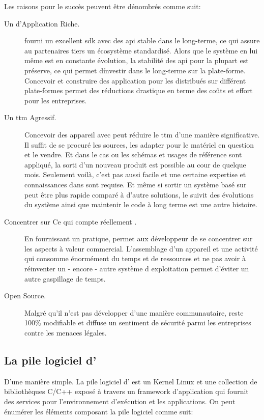Les raisons pour le succès \android{} peuvent être
dénombrés comme suit:
\begin{description}
\item [Un  d'Application Riche.] \android{} fourni un
excellent \gls{sdk} avec des \gls{api} stable dans le long-terme, ce
qui assure au partenaires tiers un écosystème standardisé. Alors que
le système en lui même est en constante évolution, la stabilité des
\gls{api} pour la plupart est préserve, ce qui permet d\'investir dans
le long-terme sur la plate-forme. Concevoir et construire des application
pour les distribués sur différent plate-formes permet des réductions
drastique en terme des coûts et effort pour les entreprises.
\item [Un \gls{ttm} Agressif.] Concevoir des appareil avec \android{}
peut réduire le \gls{ttm} d'une manière significative. Il suffit
de se procuré les sources, les adapter pour le matériel en question
et le vendre. Et dans le cas ou les schémas et usages de référence
sont appliqué, la sorti d'un nouveau produit est possible au cour de
quelque mois. Seulement voilà, c'est pas aussi facile et une certaine
expertise et connaissances dans \android{} sont requise. Et même si
sortir un système basé sur \android{} peut être plus rapide comparé
à d'autre solutions, le suivit des évolutions du système ainsi que
maintenir le code à long terme est une autre histoire.
\item [Concentrer sur \og Ce qui compte réellement \fg.] En fournissant
un  pratique, \android{} permet aux développeur de se
concentrer sur les aspects à valeur commercial. L'assemblage d'un
appareil et une activité qui consomme énormément du temps et de
ressources et ne pas avoir à réinventer un - encore - autre système
d exploitation permet d'éviter un autre gaspillage de temps.
\item [Open Source.] Malgré qu'il n'est pas développer d'une manière
communautaire, \android{} reste 100\% modifiable et diffuse un sentiment
de sécurité parmi les entreprises contre les menaces légales.
\end{description}

\subsection[La pile logiciel d'\android{}]{La pile logiciel d'\android{}\cite{pa4ad:chptr1}}

D'une manière simple. La pile logiciel d'\android{} est un Kernel Linux et une collection de bibliothèques C/C++ exposé à travers un framework d'application qui fournit des services pour l'environnement d'exécution et les applications. On peut énumérer les éléments composant la pile logiciel comme suit:

